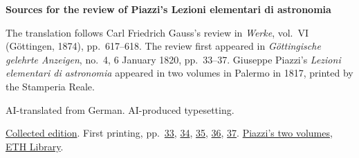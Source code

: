 \clearpage\thispagestyle{empty}
\begin{center}\Large\bfseries Sources for the review of Piazzi’s Lezioni elementari di astronomia\end{center}

The translation follows Carl Friedrich Gauss’s review in \emph{Werke}, vol.~VI (Göttingen, 1874), pp.~617--618. The review first appeared in \emph{Göttingische gelehrte Anzeigen}, no.~4, 6 January 1820, pp.~33--37. Giuseppe Piazzi’s \emph{Lezioni elementari di astronomia} appeared in two volumes in Palermo in 1817, printed by the Stamperia Reale.

AI-translated from German. AI-produced typesetting.

\href{https://gdz.sub.uni-goettingen.de/id/PPN236007467}{Collected edition}. First printing, pp.~\href{https://images.p.sub.uni-goettingen.de/iiif/image/gdz:PPN319721507_1820:00000035/full/1650,/0/default.jpg}{33}, \href{https://images.p.sub.uni-goettingen.de/iiif/image/gdz:PPN319721507_1820:00000036/full/1650,/0/default.jpg}{34}, \href{https://images.p.sub.uni-goettingen.de/iiif/image/gdz:PPN319721507_1820:00000037/full/1650,/0/default.jpg}{35}, \href{https://images.p.sub.uni-goettingen.de/iiif/image/gdz:PPN319721507_1820:00000038/full/1650,/0/default.jpg}{36}, \href{https://images.p.sub.uni-goettingen.de/iiif/image/gdz:PPN319721507_1820:00000039/full/1650,/0/default.jpg}{37}. \href{https://doi.org/10.3931/e-rara-49276}{Piazzi’s two volumes, ETH Library}.

\clearpage
